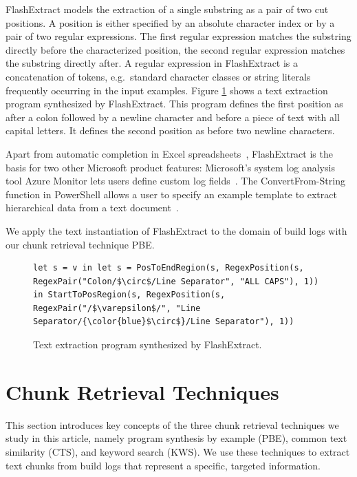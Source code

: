 FlashExtract models the extraction of a single substring as a pair of two cut positions.
A position is either specified by an absolute character index or by a pair of two regular expressions.
The first regular expression matches the substring directly before the characterized position, the second regular expression matches the substring directly after.
A regular expression in FlashExtract is a concatenation of tokens, e.g.\ standard character classes or string literals frequently occurring in the input examples.
Figure \ref{lst:prose-program} shows a text extraction program synthesized by FlashExtract.
This program defines the first position as after a colon followed by a newline character and before a piece of text with all capital letters.
It defines the second position as before two newline characters.

Apart from automatic completion in Excel spreadsheets~\cite{excel2019flashfill}, FlashExtract is the basis for two other Microsoft product features:
Microsoft's system log analysis tool Azure Monitor lets users define custom log fields~\cite{azure2019custom}.
The ConvertFrom-String function in PowerShell allows a user to specify an example template to extract hierarchical data from a text document~\cite{powershell2019convert}.

We apply the text instantiation of FlashExtract to the domain of build logs with our chunk retrieval technique PBE\@.

\begin{figure}[!t]
  \centering
  \begin{lstlisting}[breaklines=true]
let s = v in let s = PosToEndRegion(s, RegexPosition(s, RegexPair("Colon/$\circ$/Line Separator", "ALL CAPS"), 1)) in StartToPosRegion(s, RegexPosition(s, RegexPair("/$\varepsilon$/", "Line Separator/{\color{blue}$\circ$}/Line Separator"), 1))
  \end{lstlisting}  
  \caption{Text extraction program synthesized by FlashExtract.}
  \label{lst:prose-program}
\end{figure}

\section{Chunk Retrieval Techniques}
\label{sec:techniques}
This section introduces key concepts of the three chunk retrieval techniques we study in this article, namely program synthesis by example (PBE), common text similarity (CTS), and keyword search (KWS).
We use these techniques to extract text chunks from build logs that represent a specific, targeted information.

